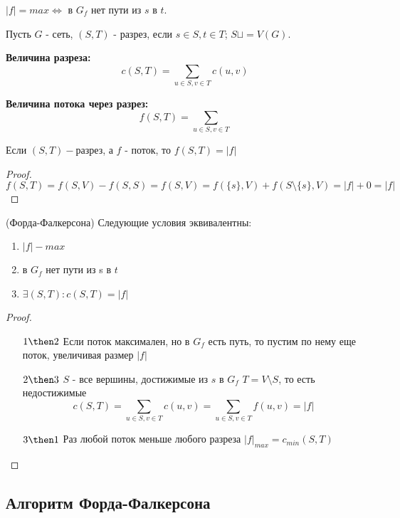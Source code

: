 \begin{lemma}
  $|f| = max \Longleftrightarrow$ в $G_f$ нет пути из $s$ в $t$. 
\end{lemma}

\begin{definition}
Пусть $G$ - сеть, $(S, T)$ - разрез, если $s \in S, t \in T$; $S \sqcup = V(G)$.  

\textbf{Величина разреза:} $$c(S, T) = \sum_{u \in S, v \in T} c(u, v)$$

\textbf{Величина потока через разрез:}$$f(S, T) = \sum_{u \in S, v\in T}$$
\end{definition}

\begin{proposition}
  Если $(S, T) - $разрез, а $f$ - поток, то $f(S, T) = |f|$
\end{proposition}

\begin{proof}
\text{}


  $f(S, T) = f(S, V) - f(S, S) = f(S, V) = f(\{s\}, V) + f(S\setminus \{s\}, V) = |f| + 0 = |f|$
\end{proof}

\begin{theorem}{(Форда-Фалкерсона)} Следующие условия эквивалентны:
  \begin{enumerate}
    \item $|f| - max$
    \item в $ G_f$ нет пути из s в $t$
    \item $\exists (S, T): c(S, T) = |f|$
  \end{enumerate}
\end{theorem}

\begin{proof}
  \text{}


  \begin{enumerate}
    \item[$1 \then 2$] Если поток максимален, но в $G_f$ есть путь, то пустим по нему еще поток, увеличивая размер $|f|$
    \item[$2 \then 3$] $S$ - все вершины, достижимые из $s$ в $G_f$ $T = V \setminus S$, то есть недостижимые 
    $$c(S, T) = \sum_{u \in S, v \in T} c(u, v) = \sum_{u \in S, v \in T} f(u, v) = |f|$$
    \item[$3 \then 1$] Раз любой поток меньше любого разреза $|f|_{max} = c_{min}(S, T) $
  \end{enumerate}
\end{proof}

\subsection{Алгоритм Форда-Фалкерсона}

